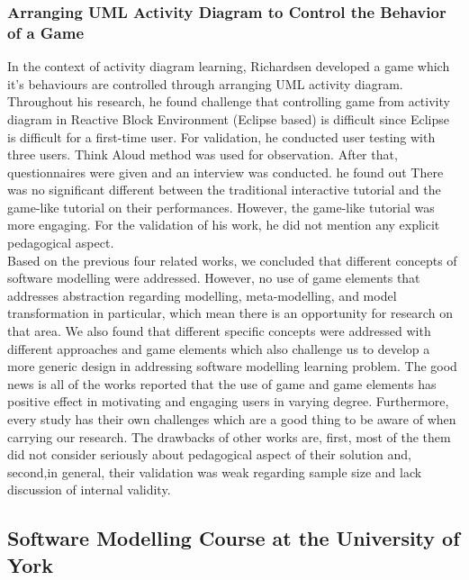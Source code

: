\documentclass[12pt, a4paper]{report}
\begin{document}
\subsubsection{Arranging UML Activity Diagram to Control the Behavior of a Game}
In the context of activity diagram learning, Richardsen  \cite{Richardsen2014} developed a game which it's behaviours are controlled through arranging UML activity diagram. Throughout his research, he found challenge that controlling game from activity diagram in Reactive Block Environment (Eclipse based) is difficult since Eclipse is difficult for a first-time user. For validation, he conducted user testing with three users. Think Aloud method was used for observation. After that, questionnaires were given and an interview was conducted. he found out There was no significant different between the traditional interactive tutorial and the game-like tutorial on their performances. However, the game-like tutorial was more engaging. For the validation of his work, he did not mention any explicit pedagogical aspect.\\

Based on the previous four related works, we concluded that different concepts of software modelling were addressed. However, no use of game elements that addresses abstraction regarding modelling, meta-modelling, and model transformation in particular, which mean there is an opportunity for research on that area. We also found that different specific concepts were addressed with different approaches and game elements which also challenge us to develop a more generic design in addressing software modelling learning problem. The good news is all of the works reported that the use of game and game elements has positive effect in motivating and engaging users in varying degree. Furthermore, every study has their own challenges which are a good thing to be aware of when carrying our research. The drawbacks of other works are, first, most of the them did not consider seriously about pedagogical aspect of their solution and, second,in general, their validation was weak regarding sample size and lack discussion of internal validity.


\subsection{Software Modelling Course at the University of York}
\end{document}
